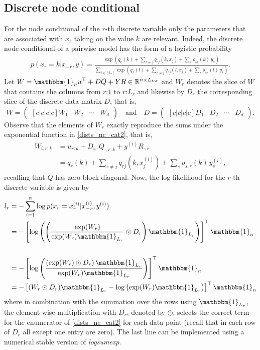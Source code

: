 \documentclass{article}
\newcommand{\oneVec}{\mathbbm{1}}
\newcommand{\IR}{{\mathbb{R}}}\newcommand{\IN}{{\mathbb{N}}}
\newcommand{\bPe}[1]{\ensuremath{\left[#1 \right]}} %
\newcommand{\bPr}[1]{\ensuremath{\left(#1 \right)}} %
\begin{document}
\subsection{Discrete node conditional}
For the node conditional of the $r$-th discrete variable only the parameters that are associated with $x_r$ taking on the value $k$ are relevant.
Indeed, the discrete node conditional of a pairwise model has the form of a logistic probability
\begin{align}
p(x_r = k|x_{-r},y)
= \frac{\exp\bPr{q_{r}(k) +\sum_{r\neq j}q_{rj}(k, x_j) + \sum_s \rho_{sr}(k) \,y_s  }}
{\sum_{l \in [L_r]} \exp\bPr{q_{r}(l) +\sum_{r\neq j}q_{rj}(l, x_j) + \sum_s \rho_{sr}(l) \,y_s  }  }. \label{dists_nc_cat2} 
\end{align}
Let  $W=\oneVec_n u^\top + D Q  + Y R \in \IR^{n \times L_{tot} }$ and $W_r$ denotes the slice of $W$ that contains the columns from $r$:$1$ to $r$:$L_r$
and likewise by $D_r$ the corresponding slice of the discrete data matrix $D$, that is, 
\[W = \begin{pmatrix}[c|c|c|c]
W_1 & W_2 & \cdots & W_{d} 
\end{pmatrix}\quad \text{and}\quad D = \begin{pmatrix}[c|c|c|c]
D_1 & D_2 & \cdots & D_{d} 
\end{pmatrix}.\]
Observe that the elements of $W_r$ exactly reproduce the sums under the exponential function in \eqref{dists_nc_cat2}, that is,
\begin{align*}
W_{i, r:k} &= u_{r:k} + D_{i, \cdot} Q_{\cdot, r: k} +  y^{(i)} R_{\cdot,r}  
\\ &= q_{r}(k) + \sum_{r\neq j} q_{rj}(k, x_j^{(i)}) + \sum_s \rho_{s,r}(k)\, y_s^{(i)},
\end{align*}
recalling that $Q$ has zero block diagonal.
Now, the log-likelihood for the $r$-th discrete variable is given by
\begin{align*}
l_r &= - \sum_{i=1}^n \log p(x_r = x_r^{(i)}|x_{-r}^{(i)},y^{(i)}) 
\\ &= -\bPe{\log\bPr{ \bPr{\frac{\exp(W_r)}{\exp(W_r) \oneVec_{L_r}} \odot D_r} \oneVec_{L_r}} }^\top\oneVec_n \\
\\ &= -\bPe{\log\bPr{ \frac{\bPr{\exp(W_r) \odot D_r} \oneVec_{L_r}}{\exp(W_r) \oneVec_{L_r}}} }^\top\oneVec_n \\
&= -\bPe{(W_r\odot D_r)\oneVec_{L_r}  - \log\bPr{\exp(W_r) \oneVec_{L_r}}}^\top \oneVec_n
\end{align*}
where in combination with the summation over the rows using $\oneVec_{L_r}$,  the element-wise multiplication with $D_r$, denoted by $\odot$, selects the correct term for the enumerator of \eqref{dists_nc_cat2} for each data point (recall that in each row of $D_r$ all except one entry are zero).
The last line can be implemented using a numerical stable version of \emph{logsumexp}.
\end{document}
